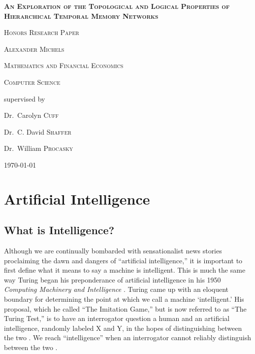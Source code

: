 \documentclass[fleqn,notitlepage,minimal]{article}
\begin{document}
	\begin{titlepage}
		\centering
		{\scshape\LARGE \textbf{An Exploration of the Topological and Logical Properties of Hierarchical Temporal Memory Networks} \par}
		{\scshape\LARGE Honors Research Paper \par}
		\vspace{1cm}
		{\scshape\Large Alexander Michels\par}
		\vspace{0.5cm}
		{\scshape\Large Mathematics and Financial Economics\par}
		\vspace{0.5cm}
		{\scshape\Large Computer Science\par}
		\vspace{1cm}
		\vfill \large
		supervised by\par
		Dr.~Carolyn \textsc{Cuff}\par
		Dr.~C. David \textsc{Shaffer}\par
		Dr.~William \textsc{Procasky}\par
		
		\vfill
		
		{\large \today\par}
	\end{titlepage}
	
	\tableofcontents
	
	\pagebreak
	
	\section{Artificial Intelligence}
	
	\subsection{What is Intelligence?}
	
	Although we are continually bombarded with sensationalist news stories proclaiming the dawn and dangers of ``artificial intelligence,'' it is important to first define what it means to say a machine is intelligent. This is much the same way Turing began his preponderance of artificial intelligence in his 1950 \textit{Computing Machinery and Intelligence} \cite{Turing}. Turing came up with an eloquent boundary for determining the point at which we call a machine `intelligent.' His proposal, which he called ``The Imitation Game,'' but is now referred to as ``The Turing Test,'' is to have an interrogator question a human and an artificial intelligence, randomly labeled X and Y, in the hopes of distinguishing between the two \cite{Turing}. We reach ``intelligence'' when an interrogator cannot reliably distinguish between the two \cite{Turing}.
	
\end{document}
